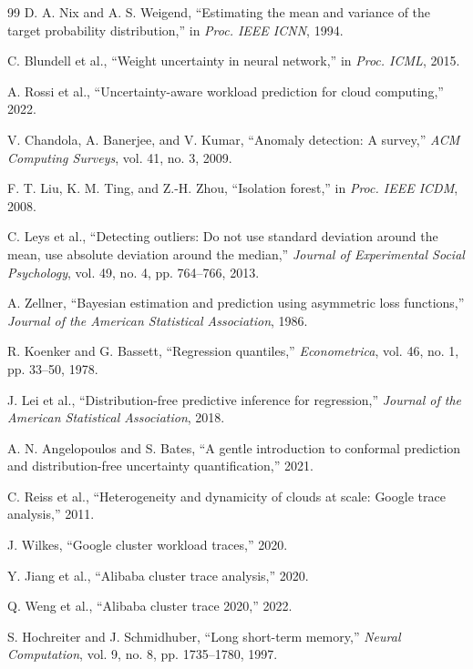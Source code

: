 \documentclass[conference]{IEEEtran}
\begin{document}
\begin{thebibliography}{99}
D. A. Nix and A. S. Weigend,
``Estimating the mean and variance of the target probability distribution,''
in \emph{Proc. IEEE ICNN}, 1994.

C. Blundell et al.,
``Weight uncertainty in neural network,''
in \emph{Proc. ICML}, 2015.

A. Rossi et al.,
``Uncertainty-aware workload prediction for cloud computing,''
2022.

V. Chandola, A. Banerjee, and V. Kumar,
``Anomaly detection: A survey,''
\emph{ACM Computing Surveys}, vol. 41, no. 3, 2009.

F. T. Liu, K. M. Ting, and Z.-H. Zhou,
``Isolation forest,''
in \emph{Proc. IEEE ICDM}, 2008.

C. Leys et al.,
``Detecting outliers: Do not use standard deviation around the mean, use absolute deviation around the median,''
\emph{Journal of Experimental Social Psychology}, vol. 49, no. 4, pp. 764--766, 2013.

A. Zellner,
``Bayesian estimation and prediction using asymmetric loss functions,''
\emph{Journal of the American Statistical Association}, 1986.

R. Koenker and G. Bassett,
``Regression quantiles,''
\emph{Econometrica}, vol. 46, no. 1, pp. 33--50, 1978.

J. Lei et al.,
``Distribution-free predictive inference for regression,''
\emph{Journal of the American Statistical Association}, 2018.

A. N. Angelopoulos and S. Bates,
``A gentle introduction to conformal prediction and distribution-free uncertainty quantification,''
2021.

C. Reiss et al.,
``Heterogeneity and dynamicity of clouds at scale: Google trace analysis,''
2011.

J. Wilkes,
``Google cluster workload traces,''
2020.

Y. Jiang et al.,
``Alibaba cluster trace analysis,''
2020.

Q. Weng et al.,
``Alibaba cluster trace 2020,''
2022.

S. Hochreiter and J. Schmidhuber,
``Long short-term memory,''
\emph{Neural Computation}, vol. 9, no. 8, pp. 1735--1780, 1997.

\end{thebibliography}
\end{document}
